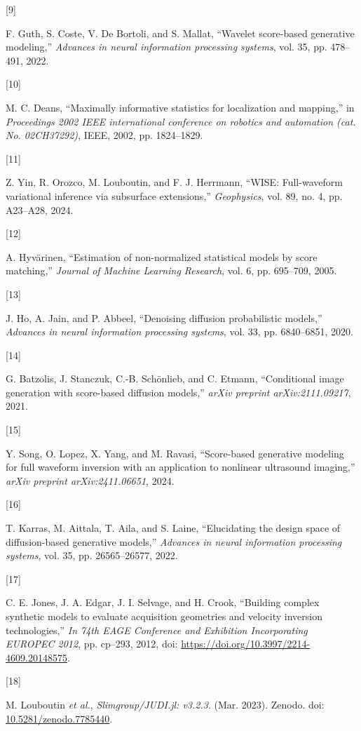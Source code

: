 \documentclass[
]{article}
\newlength{\cslhangindent}
\newlength{\csllabelwidth}
\newenvironment{CSLReferences}[2] %
 {\begin{list}{}{%
  \setlength{\itemindent}{0pt}
  \setlength{\leftmargin}{0pt}
  \setlength{\parsep}{0pt}
  \ifodd #1
   \setlength{\leftmargin}{\cslhangindent}
   \setlength{\itemindent}{-1\cslhangindent}
  \fi
  \setlength{\itemsep}{#2\baselineskip}}}
 {\end{list}}
\newcommand{\CSLLeftMargin}[1]{\parbox[t]{\csllabelwidth}{\strut#1\strut}}
\newcommand{\CSLRightInline}[1]{\parbox[t]{\linewidth - \csllabelwidth}{\strut#1\strut}}
\begin{document}
\begin{CSLReferences}{0}{0}
\CSLLeftMargin{{[}9{]} }%
\CSLRightInline{F. Guth, S. Coste, V. De Bortoli, and S. Mallat,
{``Wavelet score-based generative modeling,''} \emph{Advances in neural
information processing systems}, vol. 35, pp. 478--491, 2022.}

\CSLLeftMargin{{[}10{]} }%
\CSLRightInline{M. C. Deans, {``Maximally informative statistics for
localization and mapping,''} in \emph{Proceedings 2002 IEEE
international conference on robotics and automation (cat. No.
02CH37292)}, IEEE, 2002, pp. 1824--1829.}

\CSLLeftMargin{{[}11{]} }%
\CSLRightInline{Z. Yin, R. Orozco, M. Louboutin, and F. J. Herrmann,
{``WISE: Full-waveform variational inference via subsurface
extensions,''} \emph{Geophysics}, vol. 89, no. 4, pp. A23--A28, 2024.}

\CSLLeftMargin{{[}12{]} }%
\CSLRightInline{A. Hyvärinen, {``Estimation of non-normalized
statistical models by score matching,''} \emph{Journal of Machine
Learning Research}, vol. 6, pp. 695--709, 2005.}

\CSLLeftMargin{{[}13{]} }%
\CSLRightInline{J. Ho, A. Jain, and P. Abbeel, {``Denoising diffusion
probabilistic models,''} \emph{Advances in neural information processing
systems}, vol. 33, pp. 6840--6851, 2020.}

\CSLLeftMargin{{[}14{]} }%
\CSLRightInline{G. Batzolis, J. Stanczuk, C.-B. Schönlieb, and C.
Etmann, {``Conditional image generation with score-based diffusion
models,''} \emph{arXiv preprint arXiv:2111.09217}, 2021.}

\CSLLeftMargin{{[}15{]} }%
\CSLRightInline{Y. Song, O. Lopez, X. Yang, and M. Ravasi,
{``Score-based generative modeling for full waveform inversion with an
application to nonlinear ultrasound imaging,''} \emph{arXiv preprint
arXiv:2411.06651}, 2024.}

\CSLLeftMargin{{[}16{]} }%
\CSLRightInline{T. Karras, M. Aittala, T. Aila, and S. Laine,
{``Elucidating the design space of diffusion-based generative models,''}
\emph{Advances in neural information processing systems}, vol. 35, pp.
26565--26577, 2022.}

\CSLLeftMargin{{[}17{]} }%
\CSLRightInline{C. E. Jones, J. A. Edgar, J. I. Selvage, and H. Crook,
{``Building complex synthetic models to evaluate acquisition geometries
and velocity inversion technologies,''} \emph{In 74th EAGE Conference
and Exhibition Incorporating EUROPEC 2012}, pp. cp--293, 2012, doi:
\url{https://doi.org/10.3997/2214-4609.20148575}.}

\CSLLeftMargin{{[}18{]} }%
\CSLRightInline{M. Louboutin \emph{et al.}, \emph{Slimgroup/JUDI.jl:
v3.2.3}. (Mar. 2023). Zenodo. doi:
\href{https://doi.org/10.5281/zenodo.7785440}{10.5281/zenodo.7785440}.}

\end{CSLReferences}
\end{document}
